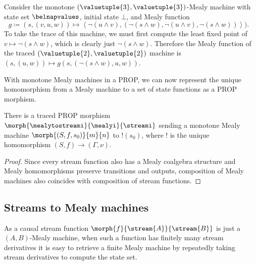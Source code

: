 \begin{example}\label{ex:trace-mealy}
    Consider the monotone \((\valuetuple{3},\valuetuple{3})\)-Mealy machine with
    state set \(\belnapvalues\), initial state \(\bot\), and Mealy function \[
        g \coloneqq (s, (v, u, w))
        \mapsto \left\langle
        \neg(u \land v),
        (\neg(s \land w), \neg(u \land v), \neg(s \land w))
        \right\rangle
        ).\]
    To take the trace of this machine, we must first compute the least fixed
    point of \(v \mapsto \neg(s \land w)\), which is clearly just
    \(\neg(s \land w)\).
    Therefore the Mealy function of the traced
    \((\valuetuple{2}, \valuetuple{2})\) machine is \(
    (s, (u, w)) \mapsto g(s, (\neg(s \land w), u, w))
    \).
\end{example}

With monotone Mealy machines in a PROP, we can now represent the unique
homomorphism from a Mealy machine to a set of state functions as a PROP
morphism.

\begin{proposition}\label{prop:mealy-to-stream}
    There is a traced PROP morphism
    \(\morph{\mealytostreami}{\mealyi}{\streami}\) sending a monotone Mealy
    machine \(\morph{\left(S, f, s_0\right)}{m}{n}\) to \(!(s_0)\), where \(!\)
    is the unique homomorphism \((S,f) \to (\Gamma,\nu)\).
\end{proposition}
\begin{proof}
    Since every stream function also has a Mealy coalgebra structure and Mealy
    homomorphisms preserve transitions and outputs,
    composition of Mealy machines also coincides with composition of stream
    functions.
\end{proof}

\subsection{Streams to Mealy machines}

As a causal stream function \(\morph{f}{\stream{A}}{\stream{B}}\) is just a
\((A,B)\)-Mealy machine, when such a function has finitely many stream
derivatives it is easy to retrieve a finite Mealy machine by repeatedly
taking stream derivatives to compute the state set.

